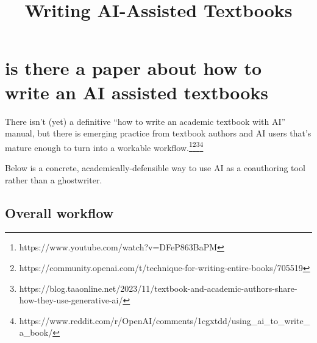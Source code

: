 \documentclass[
  11pt,
]{article}
\title{Writing AI-Assisted Textbooks}
\author{}
\date{}
\begin{document}
\maketitle

\section{is there a paper about how to write an AI assisted textbooks}\label{is-there-a-paper-about-how-to-write-an-ai-assisted-textbooks}

There isn't (yet) a definitive ``how to write an academic textbook with AI'' manual, but there is emerging practice from textbook authors and AI users that's mature enough to turn into a workable workflow.\footnote{https://www.youtube.com/watch?v=DFeP863BaPM}\footnote{https://community.openai.com/t/technique-for-writing-entire-books/705519}\footnote{https://blog.taaonline.net/2023/11/textbook-and-academic-authors-share-how-they-use-generative-ai/}\footnote{https://www.reddit.com/r/OpenAI/comments/1cgxtdd/using\_ai\_to\_write\_a\_book/}

Below is a concrete, academically-defensible way to use AI as a coauthoring tool rather than a ghostwriter.

\subsection{Overall workflow}\label{overall-workflow}
\end{document}
